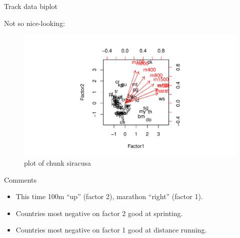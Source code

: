 \documentclass[ignorenonframetext,]{beamer}
\newenvironment{Shaded}{\begin{snugshade}}{\end{snugshade}}
\newcommand{\DataTypeTok}[1]{\textcolor[rgb]{0.13,0.29,0.53}{#1}}
\newcommand{\KeywordTok}[1]{\textcolor[rgb]{0.13,0.29,0.53}{\textbf{#1}}}
\newcommand{\NormalTok}[1]{#1}
\newcommand{\OperatorTok}[1]{\textcolor[rgb]{0.81,0.36,0.00}{\textbf{#1}}}
\begin{document}
\begin{frame}[fragile]{Track data biplot}
\protect\hypertarget{track-data-biplot}{}

Not so nice-looking:

\begin{Shaded}
\end{Shaded}

\begin{figure}
\centering
\includegraphics{figure/siracusa-1.pdf}
\caption{plot of chunk siracusa}
\end{figure}

\end{frame}

\begin{frame}{Comments}
\protect\hypertarget{comments-30}{}

\begin{itemize}
\item
  This time 100m ``up'' (factor 2), marathon ``right'' (factor 1).
\item
  Countries most negative on factor 2 good at sprinting.
\item
  Countries most negative on factor 1 good at distance running.
\end{itemize}

\end{frame}
\end{document}
